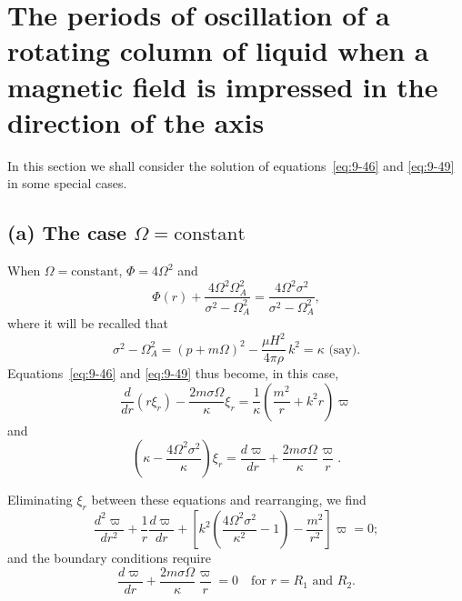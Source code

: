 \section{The periods of oscillation of a rotating column of liquid when a magnetic field is impressed in the direction of the axis}
\label{sec:82}

In this section we shall consider the solution of equations~\eqref{eq:9-46} and \eqref{eq:9-49} in some special cases.

\subsection*{(a) The case $\Omega = \mathrm{constant}$}

When $\Omega = \text{constant}$, $\Phi = 4\Omega^2$ and
\begin{equation}
\Phi(r) + \frac{4\Omega^2\Omega_A^2}{\sigma^2 - \Omega_A^2} = \frac{4\Omega^2\sigma^2}{\sigma^2 - \Omega_A^2}, \label{eq:9-74a}
\end{equation}
where it will be recalled that
\begin{equation}
\sigma^2 - \Omega_A^2 = (p + m\Omega)^2 - \frac{\mu H^2}{4\pi\rho}\, k^2 = \kappa \text{ (say)}. \label{eq:9-75}
\end{equation}
Equations~\eqref{eq:9-46} and \eqref{eq:9-49} thus become, in this case,
\begin{equation}
\frac{d}{dr}(r\xi_r) - \frac{2m\sigma\Omega}{\kappa}\xi_r = \frac{1}{\kappa}\left(\frac{m^2}{r} + k^2 r\right)\varpi \label{eq:9-76}
\end{equation}
and
\begin{equation}
\left(\kappa - \frac{4\Omega^2\sigma^2}{\kappa}\right)\xi_r = \frac{d\varpi}{dr} + \frac{2m\sigma\Omega}{\kappa}\frac{\varpi}{r}. \label{eq:9-77}
\end{equation}

Eliminating $\xi_r$ between these equations and rearranging, we find
\begin{equation}
\frac{d^2\varpi}{dr^2} + \frac{1}{r}\frac{d\varpi}{dr} + \left[k^2\left(\frac{4\Omega^2\sigma^2}{\kappa^2} - 1\right) - \frac{m^2}{r^2}\right]\varpi = 0; \label{eq:9-78}
\end{equation}
and the boundary conditions require
\begin{equation}
\frac{d\varpi}{dr} + \frac{2m\sigma\Omega}{\kappa}\frac{\varpi}{r} = 0 \quad \text{for } r = R_1 \text{ and } R_2. \label{eq:9-79}
\end{equation}


